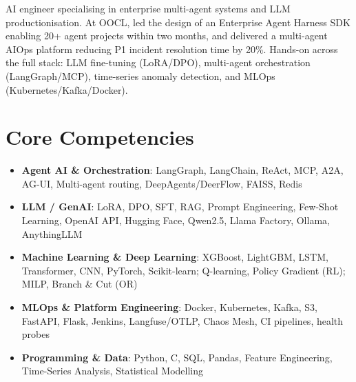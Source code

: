 \documentclass[11pt,a4paper,sans]{moderncv}
\begin{document}
\makecvtitle


\vspace{6pt}
\small{AI engineer specialising in enterprise multi-agent systems and LLM productionisation. At OOCL, led the design of an Enterprise Agent Harness SDK enabling 20+ agent projects within two months, and delivered a multi-agent AIOps platform reducing P1 incident resolution time by 20\%. Hands-on across the full stack: LLM fine-tuning (LoRA/DPO), multi-agent orchestration (LangGraph/MCP), time-series anomaly detection, and MLOps (Kubernetes/Kafka/Docker).}


\section{Core Competencies}
\vspace{1pt}
\begin{itemize}

\item \textbf{Agent AI \& Orchestration}: LangGraph, LangChain, ReAct, MCP, A2A, AG-UI, Multi-agent routing, DeepAgents/DeerFlow, FAISS, Redis

\item \textbf{LLM / GenAI}: LoRA, DPO, SFT, RAG, Prompt Engineering, Few-Shot Learning, OpenAI API, Hugging Face, Qwen2.5, Llama Factory, Ollama, AnythingLLM

\item \textbf{Machine Learning \& Deep Learning}: XGBoost, LightGBM, LSTM, Transformer, CNN, PyTorch, Scikit-learn; Q-learning, Policy Gradient (RL); MILP, Branch \& Cut (OR)

\item \textbf{MLOps \& Platform Engineering}: Docker, Kubernetes, Kafka, S3, FastAPI, Flask, Jenkins, Langfuse/OTLP, Chaos Mesh, CI pipelines, health probes

\item \textbf{Programming \& Data}: Python, C, SQL, Pandas, Feature Engineering, Time-Series Analysis, Statistical Modelling

\end{itemize}

\end{document}
